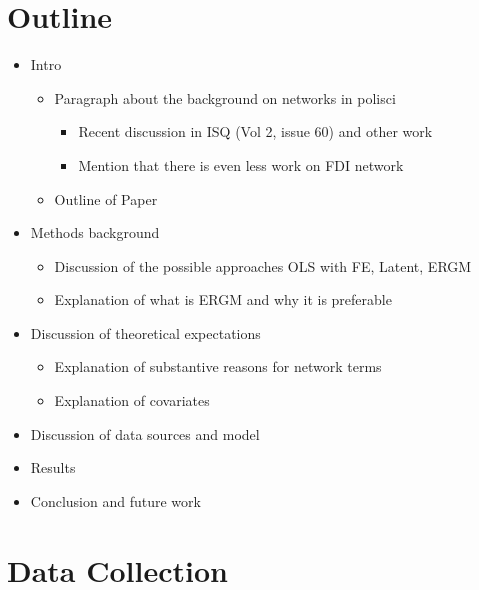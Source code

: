 \documentclass{article}
\begin{document}
\newpage

\section{Outline}
\begin{itemize}
  \item{Intro}
    \begin{itemize}
      \item{Paragraph about the background on networks in polisci}
     	 \begin{itemize}
      	\item{Recent discussion in ISQ (Vol 2, issue 60) and other work}
      	\item{Mention that there is even less work on FDI network}
      	\end{itemize}
	\item{Outline of Paper}
    \end{itemize}
  \item{Methods background}
   \begin{itemize}
      	\item{Discussion of the possible approaches OLS with FE, Latent, ERGM}
      	\item{Explanation of what is ERGM and why it is preferable}
      	\end{itemize}
  \item{Discussion of theoretical expectations}
  \begin{itemize}
      	\item{Explanation of substantive reasons for network terms}
      	\item{Explanation of covariates}
      	\end{itemize}
   \item{Discussion of data sources and model}
     \item{Results}
     \item{Conclusion and future work}
\end{itemize}





\newpage
\section{Data Collection}
\end{document}
